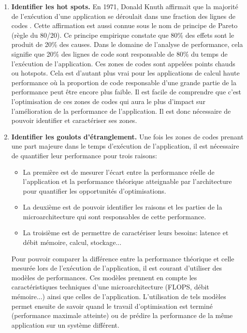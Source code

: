         \begin{enumerate}
            
            \item \textbf{Identifier les hot spots.} En 1971, Donald Knuth affirmait que la majorité de l’exécution d'une application se déroulait dans une fraction des lignes de codes \cite{knuth1971empirical}. Cette affirmation est aussi connue sous le nom de principe de Pareto  (règle du 80/20). Ce principe empirique constate que 80\% des effets sont le produit de 20\% des causes. Dans le domaine de l’analyse de performance, cela signifie que 20\% des lignes de code sont responsable de 80\% du temps de l'exécution de l'application. Ces zones de codes sont appelées points chauds ou \glspl{hotspot}. Cela est d’autant plus vrai pour les applications de calcul haute performance où la proportion de code responsable d'une grande partie de la performance peut être encore plus faible. Il est facile de comprendre que c'est l'optimisation de ces zones de codes qui aura le plus d'impact sur l'amélioration de la performance de l'application. Il est donc nécessaire de pouvoir identifier et caractériser ses zones.
            
            \item \textbf{Identifier les goulots d'étranglement.} Une fois les zones de codes prenant une part majeure dans le temps d'exécution de l'application, il est nécessaire de quantifier leur performance pour trois raisons: 
            \begin{itemize}
                \item La première est de mesurer l'écart entre la performance réelle de l'application et la performance théorique atteignable par l'architecture pour quantifier les opportunités d'optimisations. 
                \item La deuxième est de pouvoir identifier les raisons et les parties de la microarchitecture qui sont responsables de cette performance. 
                \item La troisième est de permettre de caractériser leurs besoins: latence et débit mémoire, calcul, stockage...
            \end{itemize}
            Pour pouvoir comparer la différence entre la performance théorique et celle mesurée lors de l'exécution de l'application, il est courant d'utiliser des modèles de performances. Ces modèles prennent en compte les caractéristiques techniques d'une microarchitecture (FLOPS, débit mémoire...) ainsi que celles de l'application. L'utilisation de tels modèles permet ensuite de savoir quand le travail d'optimisation est terminé (performance maximale atteinte) ou de prédire la performance de la même application sur un système différent.
        \end{enumerate}
        

